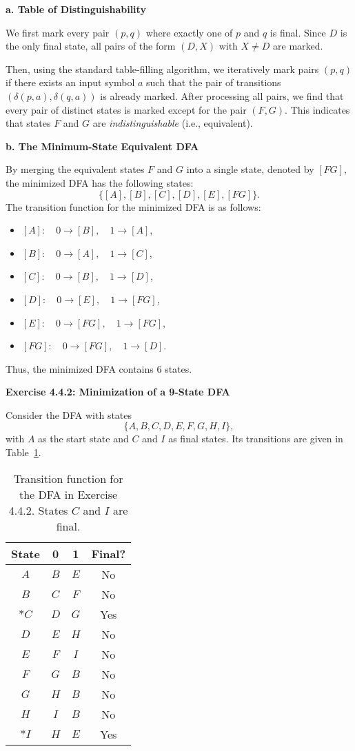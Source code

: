 \documentclass{article}
\theoremstyle{theorem}
\theoremstyle{definition}
\theoremstyle{remark}
\begin{document}
\textbf{a. Table of Distinguishability}

We first mark every pair \((p,q)\) where exactly one of \(p\) and \(q\) is final. Since \(D\) is the only final state, all pairs of the form \((D,X)\) with \(X \neq D\) are marked.

Then, using the standard table-filling algorithm, we iteratively mark pairs \((p,q)\) if there exists an input symbol \(a\) such that the pair of transitions \((\delta(p,a), \delta(q,a))\) is already marked. After processing all pairs, we find that every pair of distinct states is marked except for the pair \((F,G)\). This indicates that states \(F\) and \(G\) are \emph{indistinguishable} (i.e., equivalent).

\textbf{b. The Minimum-State Equivalent DFA}

By merging the equivalent states \(F\) and \(G\) into a single state, denoted by \([FG]\), the minimized DFA has the following states:
\[
\{[A], [B], [C], [D], [E], [FG]\}.
\]
The transition function for the minimized DFA is as follows:
\begin{itemize}
  \item \([A]:\quad 0 \to [B],\quad 1 \to [A]\),
  \item \([B]:\quad 0 \to [A],\quad 1 \to [C]\),
  \item \([C]:\quad 0 \to [B],\quad 1 \to [D]\),
  \item \([D]:\quad 0 \to [E],\quad 1 \to [FG]\),
  \item \([E]:\quad 0 \to [FG],\quad 1 \to [FG]\),
  \item \([FG]:\quad 0 \to [FG],\quad 1 \to [D]\).
\end{itemize}
Thus, the minimized DFA contains 6 states.

\textbf{Exercise 4.4.2: Minimization of a 9-State DFA}

Consider the DFA with states
\[
\{A, B, C, D, E, F, G, H, I\},
\]
with \(A\) as the start state and \(C\) and \(I\) as final states. Its transitions are given in Table~\ref{tab:dfa2}.

\begin{table}[h]
  \centering
  \begin{tabular}{c|cc|c}
    \textbf{State} & \textbf{0} & \textbf{1} & \textbf{Final?} \\ \hline
    \(A\) & \(B\) & \(E\) & No \\
    \(B\) & \(C\) & \(F\) & No \\
    \(*C\) & \(D\) & \(G\) & Yes \\
    \(D\) & \(E\) & \(H\) & No \\
    \(E\) & \(F\) & \(I\) & No \\
    \(F\) & \(G\) & \(B\) & No \\
    \(G\) & \(H\) & \(B\) & No \\
    \(H\) & \(I\) & \(B\) & No \\
    \(*I\) & \(H\) & \(E\) & Yes \\
  \end{tabular}
  \caption{Transition function for the DFA in Exercise 4.4.2. States \(C\) and \(I\) are final.}
  \label{tab:dfa2}
\end{table}
\end{document}
